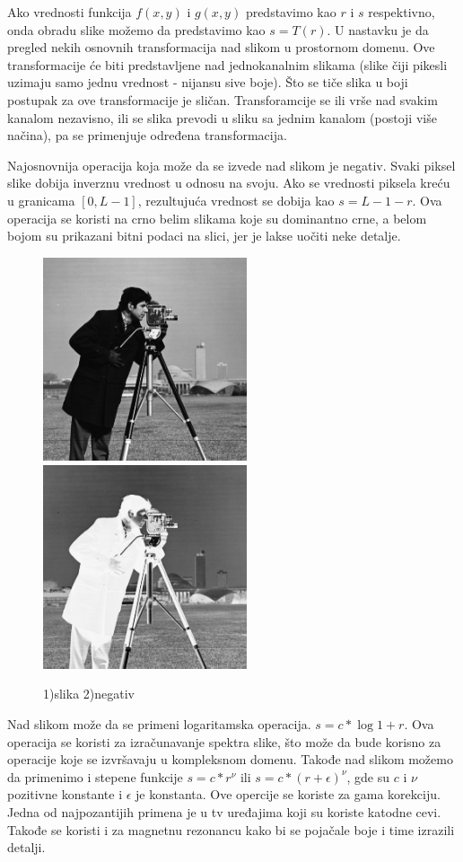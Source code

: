 \documentclass[a4paper,12pt,titlepage]{article}
\begin{document}
Ako vrednosti funkcija $f(x, y)$ i $g(x, y)$ predstavimo kao $r$ i $s$ respektivno, onda obradu slike možemo da predstavimo kao $s = T(r)$. U nastavku je da pregled nekih osnovnih transformacija nad slikom u prostornom domenu. Ove transformacije će biti predstavljene nad jednokanalnim slikama (slike čiji pikesli uzimaju samo jednu vrednost - nijansu sive boje). Što se tiče slika u boji postupak za ove transformacije je sličan. Transforamcije se ili vrše nad svakim kanalom nezavisno, ili se slika prevodi u sliku sa jednim kanalom (postoji više načina), pa se primenjuje određena transformacija.

Najosnovnija operacija koja može da se izvede nad slikom je negativ. Svaki piksel slike dobija inverznu vrednost u odnosu na svoju. Ako se vrednosti piksela kreću u granicama $[0, L - 1]$, rezultujuća vrednost se dobija kao $s = L - 1 - r$. Ova operacija se koristi na crno belim slikama koje su dominantno crne, a belom bojom su prikazani bitni podaci na slici, jer je lakse uočiti neke detalje.

\begin{figure}[ht!]
\centering
\includegraphics[width=60mm]{img/img.png}
\includegraphics[width=60mm]{img/imgNegative.png}
\caption{1)slika 2)negativ}
\label{overflow}
\end{figure} 

Nad slikom može da se primeni logaritamska operacija. $s = c*\log{1+ r}$. Ova operacija se koristi za izračunavanje spektra slike, što može da bude korisno za operacije koje se izvršavaju u kompleksnom domenu. Takođe nad slikom možemo da primenimo i stepene funkcije $s  = c*r^{\nu}$ ili $s = c*(r + \epsilon)^{\nu}$, gde su $c$ i $\nu$ pozitivne konstante i $\epsilon$ je konstanta. Ove opercije se koriste za gama korekciju. Jedna od najpozantijih primena je u tv uređajima koji su koriste katodne cevi. Takođe se koristi i za magnetnu rezonancu kako bi se pojačale boje i time izrazili detalji. 
\end{document}
